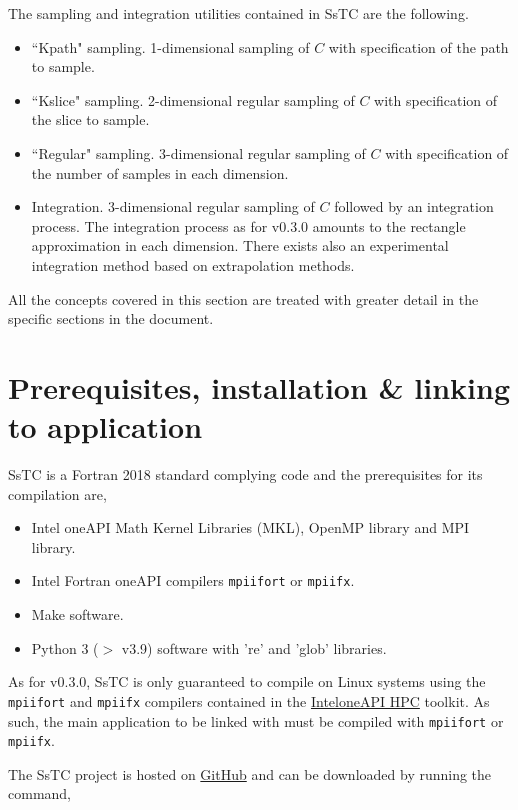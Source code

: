 \documentclass[10pt,a4paper]{article}
\begin{document}
The sampling and integration utilities contained in SsTC are the following.
\begin{tcolorbox}\begin{itemize}
\item ``Kpath" sampling. 1-dimensional sampling of $C$ with specification of the path to sample.
\item ``Kslice" sampling. 2-dimensional regular sampling of $C$ with specification of the slice to sample.
\item ``Regular" sampling. 3-dimensional regular sampling of $C$ with specification of the number of samples in each dimension.
\item Integration. 3-dimensional regular sampling of $C$ followed by an integration process. The integration process as for v0.3.0 amounts to the rectangle approximation in each dimension. There exists also an experimental integration method based on extrapolation methods.
\end{itemize}\end{tcolorbox}
All the concepts covered in this section are treated with greater detail in the specific sections in the document.
\section{Prerequisites, installation \& linking to application}\label{sec:install}
SsTC is a Fortran 2018 standard complying code and the prerequisites for its compilation are,
\begin{tcolorbox}\begin{itemize}
\item Intel oneAPI Math Kernel Libraries (MKL), OpenMP library and MPI library.
\item Intel Fortran oneAPI compilers \verb|mpiifort| or \verb|mpiifx|.
\item Make software.
\item Python 3 ($>$ v3.9) software with 're' and 'glob' libraries.
\end{itemize}\end{tcolorbox}
As for v0.3.0, SsTC is only guaranteed to compile on Linux systems using the \verb|mpiifort| and \verb|mpiifx| compilers contained in the \href{https://www.intel.com/content/www/us/en/developer/tools/oneapi/hpc-toolkit.html}{Intel\textregistered oneAPI HPC} toolkit. As such, the main application to be linked with must be compiled with \verb|mpiifort| or \verb|mpiifx|.

The SsTC project is hosted on \href{https://github.com/irukoa/SsTC}{GitHub} and can be downloaded by running the command,
\end{document}
